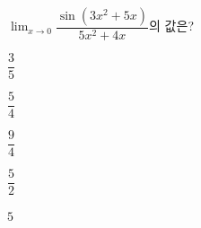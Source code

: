 $\displaystyle\lim_{x\to 0}\dfrac{\sin(3x^2+5x)}{5x^2+4x}$의 값은?
\begin{choices32}{\rule[-3ex]{0pt}{8ex}$\dfrac{3}{5}$}{\rule[-3ex]{0pt}{8ex}$\dfrac{5}{4}$}{\rule[-3ex]{0pt}{8ex}$\dfrac{9}{4}$}{\rule[-3ex]{0pt}{8ex}$\dfrac{5}{2}$}{\rule[-3ex]{0pt}{8ex}$5$}\end{choices32}
